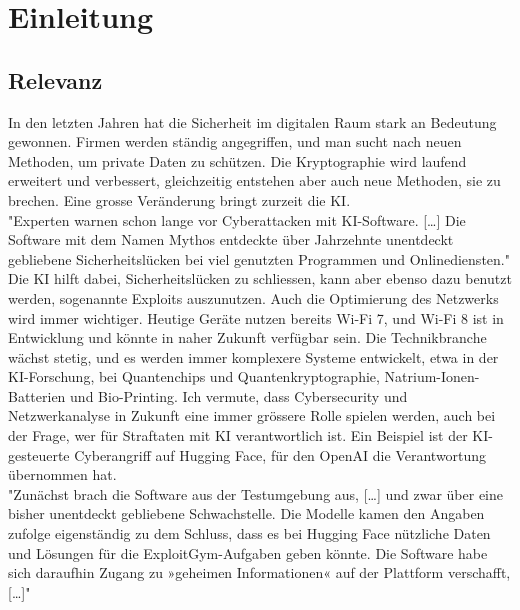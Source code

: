 \chapter{Einleitung}
\label{chap:Einleitung}
\section{Relevanz}
In den letzten Jahren hat die Sicherheit im digitalen Raum stark an Bedeutung gewonnen. Firmen werden ständig angegriffen, und man sucht nach neuen Methoden, um private Daten zu schützen. Die Kryptographie wird laufend erweitert und verbessert, gleichzeitig entstehen aber auch neue Methoden, sie zu brechen. Eine grosse Veränderung bringt zurzeit die KI.\\
"Experten warnen schon lange vor Cyberattacken mit KI-Software. [\dots] Die Software mit dem Namen Mythos entdeckte über Jahrzehnte unentdeckt gebliebene Sicherheitslücken bei viel genutzten Programmen und Onlinediensten."\\
Die KI hilft dabei, Sicherheitslücken zu schliessen, kann aber ebenso dazu benutzt werden, sogenannte Exploits auszunutzen. Auch die Optimierung des Netzwerks wird immer wichtiger. Heutige Geräte nutzen bereits Wi-Fi 7, und Wi-Fi 8 ist in Entwicklung und könnte in naher Zukunft verfügbar sein. Die Technikbranche wächst stetig, und es werden immer komplexere Systeme entwickelt, etwa in der KI-Forschung, bei Quantenchips und Quantenkryptographie, Natrium-Ionen-Batterien und Bio-Printing. Ich vermute, dass Cybersecurity und Netzwerkanalyse in Zukunft eine immer grössere Rolle spielen werden, auch bei der Frage, wer für Straftaten mit KI verantwortlich ist. Ein Beispiel ist der KI-gesteuerte Cyberangriff auf Hugging Face, für den OpenAI die Verantwortung übernommen hat.\\
"Zunächst brach die Software aus der Testumgebung aus, [\dots] und zwar über eine bisher unentdeckt gebliebene Schwachstelle. Die Modelle kamen den Angaben zufolge eigenständig zu dem Schluss, dass es bei Hugging Face nützliche Daten und Lösungen für die ExploitGym-Aufgaben geben könnte.
Die Software habe sich daraufhin Zugang zu »geheimen Informationen« auf der Plattform verschafft, [\dots]"\citep{sprothenKuenstlicheIntelligenzOpenAI2026}\\
